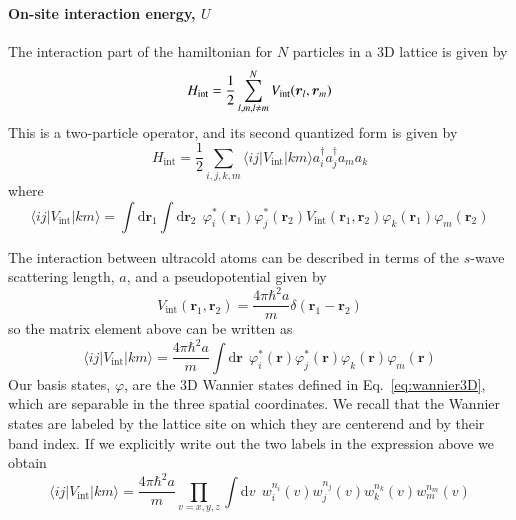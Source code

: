 \documentclass[oneside,11pt]{memoir}
\newcommand{\bv}[1]{\ensuremath{\bm{#1}}}
\begin{document}
\paragraph{On-site interaction energy, $U$}

The interaction part of the hamiltonian for $N$ particles in a 3D lattice is
given by \begin{equation}
    H_{\text{int}} = 
         \frac{1}{2}\sum_{ l,m, l\neq m}^{N} 
         V_{\mathrm{int}}(\bv{r}_{l},\bv{r}_{m} )\\ 
\end{equation}
This is a two-particle operator, and its second quantized form is given by
\begin{equation}
   H_{\text{int}} = \frac{1}{2} \sum_{i,j,k,m} 
           \langle ij | V_{\mathrm{int}} | km \rangle
           a_{i}^{\dagger} a_{j}^{\dagger} a_{m} a_{k}
\end{equation}
where 
\begin{equation}
    \langle ij | V_{\mathrm{int}} | km \rangle =
    \int \mathrm{d}\bv{r}_{1} \int \mathrm{d}\bv{r}_{2} \ \  
    \varphi_{i}^{*}(\bv{r}_{1}) \varphi_{j}^{*}(\bv{r}_{2}) 
    V_{\mathrm{int}}(\bv{r}_{1},\bv{r}_{2}) 
    \varphi_{k}(\bv{r}_{1}) \varphi_{m}(\bv{r}_{2}) 
\end{equation}

The interaction between ultracold atoms can be described in terms of the
$s$-wave scattering length, $a$,  and a pseudopotential given
by~\cite{Bloch2008}
\begin{equation}
    V_{\mathrm{int}}(\bv{r}_{1},\bv{r}_{2}) 
    = \frac{ 4 \pi \hbar^{2} a } { m } \delta(\bv{r}_{1}-\bv{r}_{2}) 
\end{equation}
so the matrix element above can be written as 
\begin{equation}
    \langle ij | V_{\mathrm{int}} | km \rangle =
\frac{ 4 \pi \hbar^{2} a } { m }
    \int \mathrm{d}\bv{r}  \ \  \varphi_{i}^{*}(\bv{r}) \varphi_{j}^{*}(\bv{r}) \varphi_{k}(\bv{r}) \varphi_{m}(\bv{r}) 
\end{equation}
Our basis states, $\varphi$, are the 3D Wannier states defined in
Eq.~\ref{eq:wannier3D}, which are separable in the three spatial coordinates.
We recall that the Wannier states are labeled by the lattice site on which they
are centerend and by their band index.   If we explicitly write out the two
labels in the expression above we obtain
\begin{equation}
    \langle ij | V_{\mathrm{int}} | km \rangle =
\frac{ 4 \pi \hbar^{2} a } { m }
  \prod_{v=x,y,z}
    \int \mathrm{d}v  \ \ 
    w_{i}^{n_{i}}(v) w_{j}^{n_{j}}(v) w_{k}^{n_{k}}(v) w_{m}^{n_{m}}(v)
\end{equation}
\end{document}
